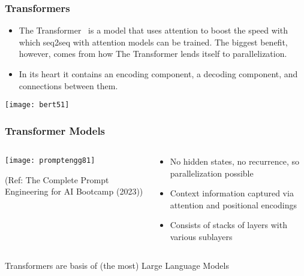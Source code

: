  


\begin{frame}[fragile]\frametitle{Transformers}


\begin{itemize}
\item The Transformer  is a model that uses attention to boost the speed with which seq2seq with attention models can be trained. The biggest benefit, however, comes from how The Transformer lends itself to parallelization. 
\item In its heart it contains an encoding component, a decoding component, and connections between them.
\end{itemize}	 

\begin{center}
\texttt{[image: bert51]}
\end{center}	

\end{frame}

\begin{frame}[fragile]\frametitle{Transformer Models}

\begin{columns}
    \begin{column}[T]{0.7\linewidth}
		\begin{center}
		\texttt{[image: promptengg81]}

		{\tiny (Ref: The Complete Prompt Engineering for AI Bootcamp (2023))}
		\end{center}	
    \end{column}
    \begin{column}[T]{0.3\linewidth}
		\begin{itemize}
		\item  No hidden states, no recurrence, so parallelization possible
		\item  Context information captured via attention and positional encodings
		\item Consists of stacks of layers with various sublayers
		\end{itemize}
    \end{column}
  \end{columns}
  
Transformers are basis of (the most) Large Language Models


\end{frame}


